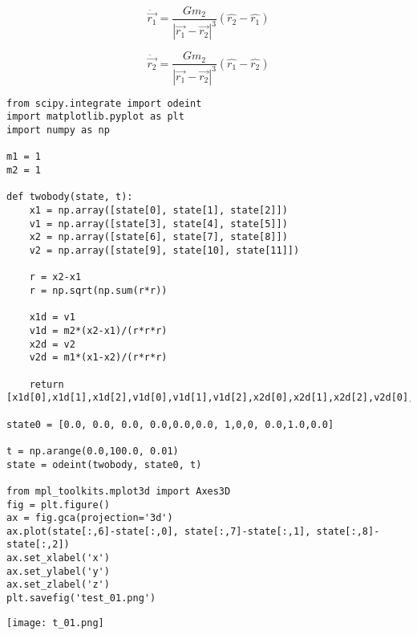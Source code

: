 \documentclass[12pt,fleqn]{article}\usepackage{../../common}
\begin{document}
$$ {\displaystyle {\ddot {\vec {r_{1}}}}={\frac {Gm_{2}}{|{\vec
        {r_{1}}}-{\vec {r_{2}}}|^{3}}}({\hat {r_{2}}}-{\hat {r_{1}}})}
$$

$${\displaystyle {\ddot {\vec {r_{2}}}}={\frac {Gm_{2}}{|{\vec
        {r_{1}}}-{\vec {r_{2}}}|^{3}}}({\hat {r_{1}}}-{\hat {r_{2}}})}
$$ 



\begin{verbatim}
from scipy.integrate import odeint
import matplotlib.pyplot as plt
import numpy as np

m1 = 1
m2 = 1

def twobody(state, t):
    x1 = np.array([state[0], state[1], state[2]])
    v1 = np.array([state[3], state[4], state[5]])
    x2 = np.array([state[6], state[7], state[8]])
    v2 = np.array([state[9], state[10], state[11]])

    r = x2-x1
    r = np.sqrt(np.sum(r*r))

    x1d = v1
    v1d = m2*(x2-x1)/(r*r*r)
    x2d = v2
    v2d = m1*(x1-x2)/(r*r*r)

    return [x1d[0],x1d[1],x1d[2],v1d[0],v1d[1],v1d[2],x2d[0],x2d[1],x2d[2],v2d[0],v2d[1],v2d[2]]

state0 = [0.0, 0.0, 0.0, 0.0,0.0,0.0, 1,0,0, 0.0,1.0,0.0]

t = np.arange(0.0,100.0, 0.01)
state = odeint(twobody, state0, t)

from mpl_toolkits.mplot3d import Axes3D
fig = plt.figure()
ax = fig.gca(projection='3d')
ax.plot(state[:,6]-state[:,0], state[:,7]-state[:,1], state[:,8]-state[:,2])
ax.set_xlabel('x')
ax.set_ylabel('y')
ax.set_zlabel('z')
plt.savefig('test_01.png')
\end{verbatim}

\texttt{[image: t\_01.png]}
\end{document}

